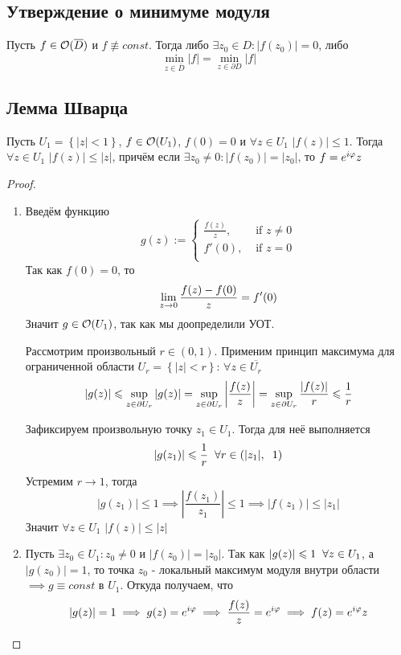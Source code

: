 \subsection{Утверждение о минимуме модуля}
\begin{theorem}
  Пусть $f\in\mathcal{O}(\overline{D})$ и $f\not\equiv const$. Тогда либо $\exists z_0\in D\colon |f(z_0)|=0$, либо
  \[\min\limits_{z\in\overline{D}}|f|=\min\limits_{z\in\partial D}|f|\]
\end{theorem}
\subsection{Лемма Шварца}
\begin{lemma}
  Пусть $U_1 = \left\{|z|<1\right\}$, $f\in\mathcal{O}(U_1)$, $f(0)=0$ и $\forall z\in U_1$ $|f(z)|\leqslant 1$. Тогда $\forall z\in U_1$ $|f(z)|\leqslant |z|$, причём если $\exists z_0\neq 0\colon |f(z_0)|=|z_0|$, то $f=e^{i\varphi}z$
\end{lemma}
\begin{proof}
  \begin{enumerate}
    \item Введём функцию
  \[g(z):=\begin{cases}
    \frac{f(z)}{z}, &\text{ if } z\neq 0\\
    f'(0), &\text{ if } z=0\\
  \end{cases}\]
  Так как $f(0) = 0$, то
    \[\lim\limits_{z \rightarrow 0}\frac{f(z)-f(0)}{z} = f'(0)\]
  Значит $g\in\mathcal{O}(U_1)$, так как мы доопределили УОТ.

  Рассмотрим произвольный $r\in (0,1)$. Применим принцип максимума для ограниченной области $U_r = \left\{|z|<r\right\}$: $\forall z\in \overline{U_r}$
  \[|g(z)|\leqslant \sup\limits_{z\in\partial U_r}|g(z)| = \sup\limits_{z\in\partial U_r} \left|\frac{f(z)}{z}\right| = \sup\limits_{z\in\partial U_r} \frac{|f(z)|}{r}\leqslant \frac{1}{r}\]

  Зафиксируем произвольную точку $z_1\in U_1$. Тогда для неё выполняется
  \[|g(z_1)|\leqslant \frac{1}{r} \hspace{0.2cm}\forall r\in(|z_1|,\hspace{0.2cm} 1)\]
  Устремим $r\to 1$, тогда
  \[|g(z_1)|\leqslant 1\implies \left|\frac{f(z_1)}{z_1}\right|\leqslant 1\implies |f(z_1)|\leqslant |z_1|\]
  Значит $\forall z\in U_1$ $|f(z)|\leqslant |z|$ 
    \item Пусть $\exists z_0\in U_1\colon z_0\neq 0$ и $|f(z_0)|=|z_0|$. Так как $|g(z)|\leqslant 1\hspace{0.2cm}\forall z\in U_1$, а $|g(z_0)| = 1$, то точка $z_0$ - локальный максимум модуля внутри области $\implies g\equiv const$ в $U_1$. Откуда получаем, что 
    \[|g(z)| = 1\implies g(z) = e^{i\varphi}\implies \frac{f(z)}{z}=e^{i\varphi}\implies f(z) = e^{i\varphi}z\]
  \end{enumerate}
\end{proof}
